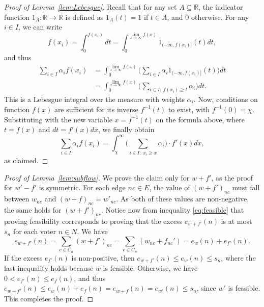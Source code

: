 \begin{proof}[Proof of Lemma~\ref{lem:Lebesgue}]
Recall that for any set $A\subseteq \mathbb{R}$, the indicator function $1_A:\mathbb{R}\rightarrow \mathbb{R}$ is defined as $1_A(t)=1$ if $t\in A$, and $0$ otherwise. For any $i\in I$, we can write
$$ f(x_i) = \int_{0}^{f(x_i)} dt = \int_0^{\lim_{x\rightarrow \infty} f(x)} 1_{(-\infty, f(x_i)]}(t)dt,$$
and thus
\begin{align*}
    \sum_{i\in I} \alpha_i f(x_i) &= \int_0^{\lim_{x\rightarrow \infty} f(x)} \Big(\sum_{i\in I} \alpha_i 1_{(-\infty, f(x_i)]}(t)\Big)dt \\
		&= \int_0^{\lim_{x\rightarrow \infty} f(x)} \Big(\sum_{i\in I: \ f(x_i)\geq t} \alpha_i \Big)dt.
\end{align*}
This is a Lebesgue integral over the measure with weights $\alpha_i$. Now, conditions on function $f(x)$ are sufficient for its inverse $f^{-1}(t)$ to exist, with $f^{-1}(0)=\chi$. Substituting with the new variable $x=f^{-1}(t)$ on the formula above, where $t=f(x)$ and $dt=f'(x)dx$, we finally obtain
$$\sum_{i\in I} \alpha_i f(x_i) =\int_{\chi}^{\infty} \Big( \sum_{i\in I: \ x_i\geq x} \alpha_i \Big)\cdot f'(x)dx,$$
as claimed.
\end{proof}

\begin{proof}[Proof of Lemma~\ref{lem:subflow}]
We prove the claim only for $w+f'$, as the proof for $w'-f'$ is symmetric. 
For each edge $nc\in E$, the value of $(w+f')_{nc}$ must fall between $w_{nc}$ and $(w+f)_{nc}=w'_{nc}$. As both of these values are non-negative, the same holds for $(w+f')_{nc}$. 
Notice now from inequality \eqref{eq:feasible} that proving feasibility corresponds to proving that the excess $e_{w+f'}(n)$ is at most $s_n$ for each voter $n\in N$. We have 
$$e_{w+f'}(n) = \sum_{c\in C_n} (w+f')_{nc}= \sum_{c\in C_n} ( w_{nc} + f_{nc}') = e_w(n) + e_{f'}(n). $$
%
If the excess $e_{f'}(n)$ is non-positive, then $e_{w+f'}(n)\leq e_w(n) \leq s_n$, where the last inequality holds because $w$ is feasible. 
Otherwise, we have  $0< e_{f'}(n)\leq e_{f}(n)$, and thus $e_{w+f'}(n)\leq e_w(n) + e_{f}(n) = e_{w+f}(n) = e_{w'}(n) \leq s_n$, since $w'$ is feasible. This completes the proof.
\end{proof}